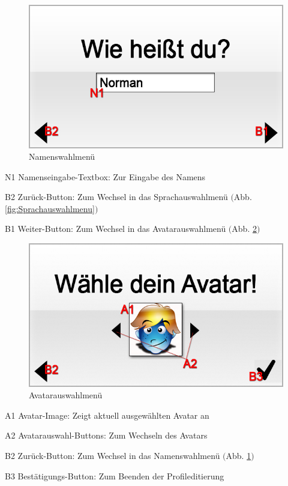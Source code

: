 
\begin{figure}[H]
\centering
\includegraphics[scale=0.55]{../gui/_jpeg_numeration/registration2.jpg}
\caption{Namenswahlmenü}
\label{fig:Namenswahlmenu}
\end{figure}
\begin{description*}
\item[N1] Namenseingabe-Textbox: Zur Eingabe des Namens
\item[B2] Zurück-Button: Zum Wechsel in das Sprachauswahlmenü $($Abb. \ref{fig:Sprachauswahlmenu}$)$
\item[B1] Weiter-Button: Zum Wechsel in das Avatarauswahlmenü $($Abb. \ref{fig:Avatarauswahlmenu}$)$
\end{description*}


\begin{figure}[H]
\centering
\includegraphics[scale=0.55]{../gui/_jpeg_numeration/registration3.jpg}
\caption{Avatarauswahlmenü}
\label{fig:Avatarauswahlmenu}
\end{figure}
\begin{description*}
\item[A1] Avatar-Image: Zeigt aktuell ausgewählten Avatar an
\item[A2] Avatarauswahl-Buttons: Zum Wechseln des Avatars
\item[B2] Zurück-Button: Zum Wechsel in das Namenswahlmenü $($Abb. \ref{fig:Namenswahlmenu}$)$
\item[B3] Bestätigungs-Button: Zum Beenden der Profileditierung
\end{description*}

